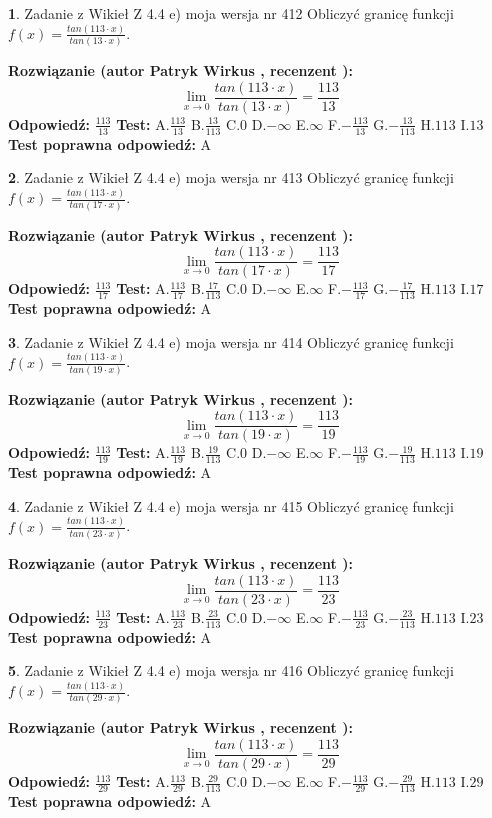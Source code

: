 \documentclass[12pt, a4paper]{article}
\theoremstyle{definition} %
\newtheorem{zad}{}
\newcommand{\zadStart}[1]{\begin{zad}#1\newline}
\newcommand{\zadStop}{\end{zad}}
\newcommand{\rozwStart}[2]{\noindent \textbf{Rozwiązanie (autor #1 , recenzent #2): }\newline}
\newcommand{\rozwStop}{\newline}
\newcommand{\odpStart}{\noindent \textbf{Odpowiedź:}\newline}
\newcommand{\odpStop}{\newline}
\newcommand{\testStart}{\noindent \textbf{Test:}\newline}
\newcommand{\testStop}{\newline}
\newcommand{\kluczStart}{\noindent \textbf{Test poprawna odpowiedź:}\newline}
\newcommand{\kluczStop}{\newline}
\begin{document}
\zadStart{Zadanie z Wikieł Z 4.4 e) moja wersja nr 412}
Obliczyć granicę funkcji $f(x)=\frac{tan(113\cdot x)}{tan(13\cdot x)}$.
\zadStop
\rozwStart{Patryk Wirkus}{}
$$\lim\limits_{x\to 0}\frac{tan(113\cdot x)}{tan(13\cdot x)}=
\frac{113}{13}$$
\rozwStop
\odpStart
$\frac{113}{13}$
\odpStop
\testStart
A.$\frac{113}{13}$
B.$\frac{13}{113}$
C.$0$
D.$-\infty$
E.$\infty$
F.$-\frac{113}{13}$
G.$-\frac{13}{113}$
H.$113$
I.$13$
\testStop
\kluczStart
A
\kluczStop



\zadStart{Zadanie z Wikieł Z 4.4 e) moja wersja nr 413}
Obliczyć granicę funkcji $f(x)=\frac{tan(113\cdot x)}{tan(17\cdot x)}$.
\zadStop
\rozwStart{Patryk Wirkus}{}
$$\lim\limits_{x\to 0}\frac{tan(113\cdot x)}{tan(17\cdot x)}=
\frac{113}{17}$$
\rozwStop
\odpStart
$\frac{113}{17}$
\odpStop
\testStart
A.$\frac{113}{17}$
B.$\frac{17}{113}$
C.$0$
D.$-\infty$
E.$\infty$
F.$-\frac{113}{17}$
G.$-\frac{17}{113}$
H.$113$
I.$17$
\testStop
\kluczStart
A
\kluczStop



\zadStart{Zadanie z Wikieł Z 4.4 e) moja wersja nr 414}
Obliczyć granicę funkcji $f(x)=\frac{tan(113\cdot x)}{tan(19\cdot x)}$.
\zadStop
\rozwStart{Patryk Wirkus}{}
$$\lim\limits_{x\to 0}\frac{tan(113\cdot x)}{tan(19\cdot x)}=
\frac{113}{19}$$
\rozwStop
\odpStart
$\frac{113}{19}$
\odpStop
\testStart
A.$\frac{113}{19}$
B.$\frac{19}{113}$
C.$0$
D.$-\infty$
E.$\infty$
F.$-\frac{113}{19}$
G.$-\frac{19}{113}$
H.$113$
I.$19$
\testStop
\kluczStart
A
\kluczStop



\zadStart{Zadanie z Wikieł Z 4.4 e) moja wersja nr 415}
Obliczyć granicę funkcji $f(x)=\frac{tan(113\cdot x)}{tan(23\cdot x)}$.
\zadStop
\rozwStart{Patryk Wirkus}{}
$$\lim\limits_{x\to 0}\frac{tan(113\cdot x)}{tan(23\cdot x)}=
\frac{113}{23}$$
\rozwStop
\odpStart
$\frac{113}{23}$
\odpStop
\testStart
A.$\frac{113}{23}$
B.$\frac{23}{113}$
C.$0$
D.$-\infty$
E.$\infty$
F.$-\frac{113}{23}$
G.$-\frac{23}{113}$
H.$113$
I.$23$
\testStop
\kluczStart
A
\kluczStop



\zadStart{Zadanie z Wikieł Z 4.4 e) moja wersja nr 416}
Obliczyć granicę funkcji $f(x)=\frac{tan(113\cdot x)}{tan(29\cdot x)}$.
\zadStop
\rozwStart{Patryk Wirkus}{}
$$\lim\limits_{x\to 0}\frac{tan(113\cdot x)}{tan(29\cdot x)}=
\frac{113}{29}$$
\rozwStop
\odpStart
$\frac{113}{29}$
\odpStop
\testStart
A.$\frac{113}{29}$
B.$\frac{29}{113}$
C.$0$
D.$-\infty$
E.$\infty$
F.$-\frac{113}{29}$
G.$-\frac{29}{113}$
H.$113$
I.$29$
\testStop
\kluczStart
A
\kluczStop
\end{document}
